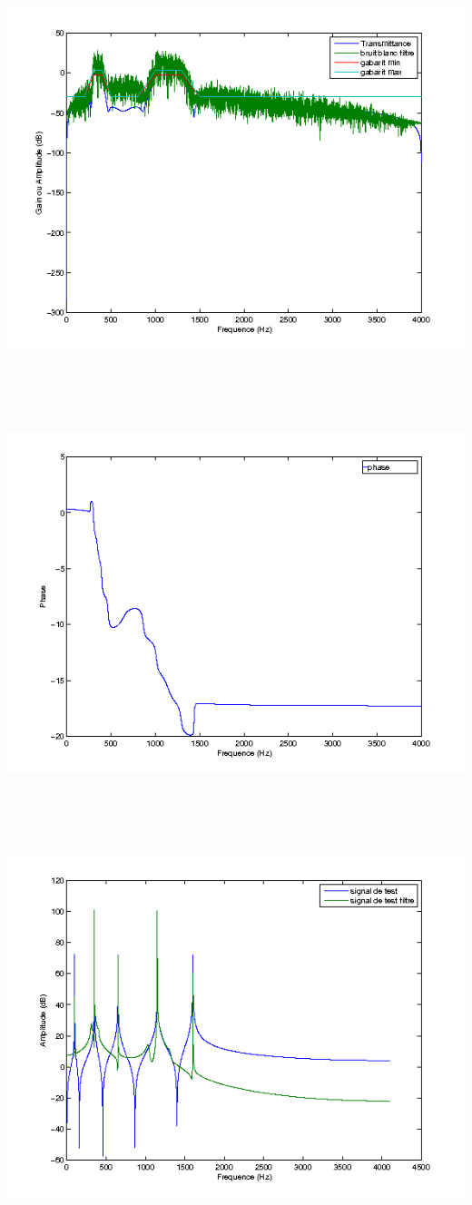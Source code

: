 \documentclass{article}
\begin{document}
\inputminted[linenos,lastline=25]{matlab}{RII_ellip.m}
\includegraphics[height=13cm]{ell_1}
\inputminted[linenos,firstnumber=29,firstline=29,lastline=29]{matlab}{RII_ellip.m}
\includegraphics[height=10cm]{ell_2}
\inputminted[linenos,firstnumber=34,firstline=34,lastline=43]{matlab}{RII_ellip.m}
\includegraphics[height=13cm]{ell_3}
\end{document}
